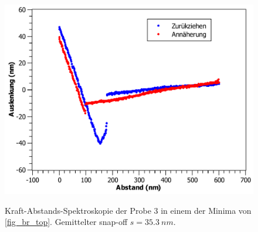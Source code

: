 \documentclass[
	a4paper,
	12pt,
	pagesize,
	ngerman
]{scrartcl}
\begin{document}
\begin{figure}[H]
{			\label{fig_br_ds5}}{\includegraphics[width=.49\linewidth]{images/BR/DS5}}
			\caption{Kraft-Abstands-Spektroskopie der Probe 3 in einem der Minima von \cref{fig_br_top}. Gemittelter snap-off $s=\SI{35.3}{nm}$.} %
			\label{fig_br_ds}
\end{figure}

\end{document}
